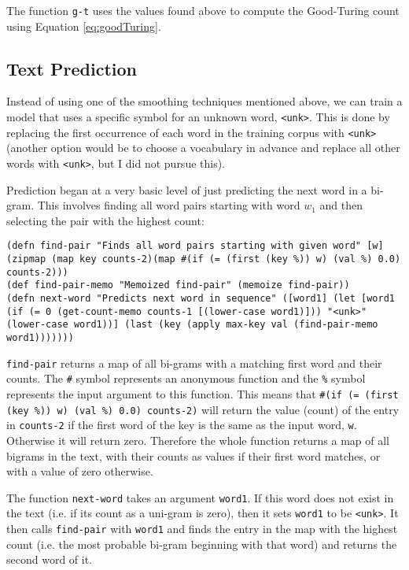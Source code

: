 The function \lstinline!g-t! uses the values found above to compute the Good-Turing count using Equation \ref{eq:goodTuring}.

\subsection{Text Prediction}

Instead of using one of the smoothing techniques mentioned above, we can train a model that uses a specific symbol for an unknown word, \lstinline!<unk>!. This is done by replacing the first occurrence of each word in the training corpus with \lstinline!<unk>! (another option would be to choose a vocabulary in advance and replace all other words with \lstinline!<unk>!, but I did not pursue this).

Prediction began at a very basic level of just predicting the next word in a bi-gram. This involves finding all word pairs starting with word $w_{1}$ and then selecting the pair with the highest count:

\begin{lstlisting}
(defn find-pair "Finds all word pairs starting with given word" [w] (zipmap (map key counts-2)(map #(if (= (first (key %)) w) (val %) 0.0) counts-2)))
(def find-pair-memo "Memoized find-pair" (memoize find-pair))
(defn next-word "Predicts next word in sequence" ([word1] (let [word1 (if (= 0 (get-count-memo counts-1 [(lower-case word1)])) "<unk>" (lower-case word1))] (last (key (apply max-key val (find-pair-memo word1)))))))
\end{lstlisting}

\lstinline!find-pair! returns a map of all bi-grams with a matching first word and their counts. The \lstinline!#! symbol represents an anonymous function and the \lstinline!%! symbol represents the input argument to this function. This means that \lstinline!#(if (= (first (key %)) w) (val %) 0.0) counts-2)! will return the value (count) of the entry in \lstinline!counts-2! if the first word of the key is the same as the input word, \lstinline!w!. Otherwise it will return zero. Therefore the whole function returns a map of all bigrams in the text, with their counts as values if their first word matches, or with a value of zero otherwise.

The function \lstinline!next-word! takes an argument \lstinline!word1!. If this word does not exist in the text (i.e. if its count as a uni-gram is zero), then it sets \lstinline!word1! to be \lstinline!<unk>!. It then calls \lstinline!find-pair! with \lstinline!word1! and finds the entry in the map with the highest count (i.e. the most probable bi-gram beginning with that word) and returns the second word of it.

